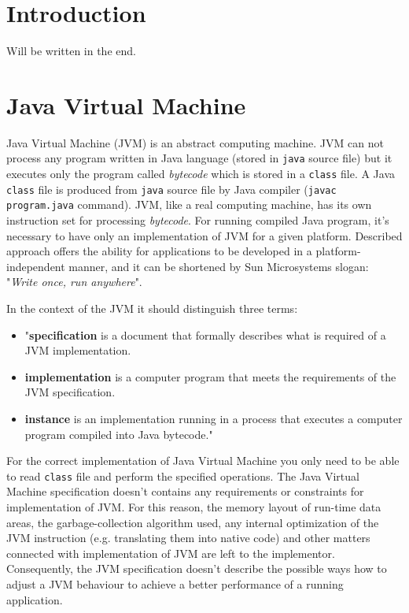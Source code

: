 \documentclass[
  digital, %
  oneside,
  notable, %
  nolof,     %
  nolot     %
]{fithesis3}
\begin{document}
\chapter{Introduction}
    Will be written in the end.

\chapter{Java Virtual Machine}

Java Virtual Machine (JVM) is an abstract computing machine. JVM can not process any program written in Java language (stored in \texttt{java} source file) but it executes only the program called \textit{bytecode} which is stored in a \texttt{class} file. A Java \texttt{class} file is produced from \texttt{java} source file by Java compiler (\texttt{javac program.java} command). JVM, like a real computing machine, has its own instruction set for processing \textit{bytecode}. For running compiled Java program, it's necessary to have only an implementation of JVM for a given platform. Described approach offers the ability for applications to be developed in a platform-independent manner, and it can be shortened by Sun Microsystems slogan: "\textit{Write once, run anywhere}". \cite{spec}

In the context of the JVM it should distinguish three terms:
\begin{itemize}
	\item "\textbf{specification} is a document that formally describes what is required of a JVM implementation.
	\item \textbf{implementation} is a computer program that meets the requirements of the JVM specification.
	\item \textbf{instance} is an implementation running in a process that executes a computer program compiled into Java bytecode." \cite{brief}
\end{itemize}

For the correct implementation of Java Virtual Machine you only need to be able to read \texttt{class} file and perform the specified operations. The Java Virtual Machine specification doesn't contains any requirements or constraints for implementation of JVM. For this reason, the memory layout of run-time data areas, the garbage-collection algorithm used, any internal optimization of the JVM instruction (e.g. translating them into native code) and other matters connected with implementation of JVM are left to the implementor. Consequently, the JVM specification doesn't describe the possible ways how to adjust a JVM behaviour to achieve a better performance of a running application. \cite{spec}
\end{document}
